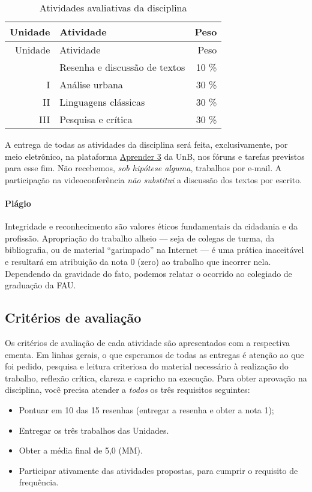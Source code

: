 \documentclass[
  11pt,
  brazil,
  a4paper,
]{article}
\providecommand{\tightlist}{%
  \setlength{\itemsep}{0pt}\setlength{\parskip}{0pt}}
\begin{document}
\begin{longtable}[]{@{}rlr@{}}
\caption{Atividades avaliativas da disciplina}\tabularnewline
\toprule
Unidade & Atividade & Peso\tabularnewline
\midrule
\endfirsthead
\toprule
Unidade & Atividade & Peso\tabularnewline
\midrule
\endhead
& Resenha e discussão de textos & 10 \%\tabularnewline
I & Análise urbana & 30 \%\tabularnewline
II & Linguagens clássicas & 30 \%\tabularnewline
III & Pesquisa e crítica & 30 \%\tabularnewline
\bottomrule
\end{longtable}

A entrega de todas as atividades da disciplina será feita,
exclusivamente, por meio eletrônico, na plataforma
\href{https://aprender3.unb.br/course/view.php?id=2766}{Aprender 3} da
UnB, nos fóruns e tarefas previstos para esse fim. Não recebemos,
\emph{sob hipótese alguma}, trabalhos por e-mail. A participação na
videoconferência \emph{não substitui} a discussão dos textos por
escrito.

\hypertarget{pluxe1gio}{%
\paragraph{Plágio}\label{pluxe1gio}}

Integridade e reconhecimento são valores éticos fundamentais da
cidadania e da profissão. Apropriação do trabalho alheio --- seja de
colegas de turma, da bibliografia, ou de material ``garimpado'' na
Internet --- é uma prática inaceitável e resultará em atribuição da nota
0 (zero) ao trabalho que incorrer nela. Dependendo da gravidade do fato,
podemos relatar o ocorrido ao colegiado de graduação da FAU.

\hypertarget{crituxe9rios-de-avaliauxe7uxe3o}{%
\subsection{Critérios de
avaliação}\label{crituxe9rios-de-avaliauxe7uxe3o}}

Os critérios de avaliação de cada atividade são apresentados com a
respectiva ementa. Em linhas gerais, o que esperamos de todas as
entregas é atenção ao que foi pedido, pesquisa e leitura criteriosa do
material necessário à realização do trabalho, reflexão crítica, clareza
e capricho na execução. Para obter aprovação na disciplina, você precisa
atender a \emph{todos} os três requisitos seguintes:

\begin{itemize}
\tightlist
\item
  Pontuar em 10 das 15 resenhas (entregar a resenha e obter a nota 1);
\item
  Entregar os três trabalhos das Unidades.
\item
  Obter a média final de 5,0 (MM).
\item
  Participar ativamente das atividades propostas, para cumprir o
  requisito de frequência.
\end{itemize}
\end{document}
